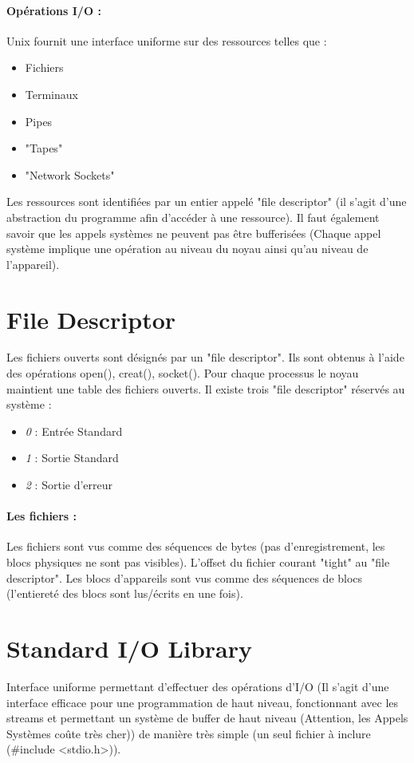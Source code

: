 \documentclass{article}[12pt]
\begin{document}
\paragraph{Opérations I/O : } Unix fournit une interface uniforme sur des ressources telles que :
\begin{itemize}
	\item Fichiers
	\item Terminaux
	\item Pipes
	\item "Tapes"
	\item "Network Sockets"
\end{itemize}
Les ressources sont identifiées par un entier appelé "file descriptor" (il s'agit d'une abstraction du programme afin d'accéder à une ressource). Il faut également savoir que les appels systèmes ne peuvent pas être bufferisées (Chaque appel système implique une opération au niveau du noyau ainsi qu'au niveau de l'appareil).
\section{File Descriptor}
Les fichiers ouverts sont désignés par un "file descriptor". Ils sont obtenus à l'aide des opérations open(), creat(), socket(). Pour chaque processus le noyau maintient une table des fichiers ouverts. Il existe trois "file descriptor" réservés au système : 
\begin{itemize}
	\item \emph{0} : Entrée Standard
	\item \emph{1} : Sortie Standard
	\item \emph{2} : Sortie d'erreur
\end{itemize}
\paragraph{Les fichiers : }
Les fichiers sont vus comme des séquences de bytes (pas d'enregistrement, les blocs physiques ne sont pas visibles). L'offset du fichier courant "tight" au "file descriptor". Les blocs d'appareils sont vus comme des séquences de blocs (l'entiereté des blocs sont lus/écrits en une fois).
\section{Standard I/O Library}
Interface uniforme permettant d'effectuer des opérations d'I/O (Il s'agit d'une interface efficace pour une programmation de haut niveau, fonctionnant avec les streams et permettant un système de buffer de haut niveau (Attention, les Appels Systèmes coûte très cher)) de manière très simple (un seul fichier à inclure (\#include <stdio.h>)).
\end{document}
